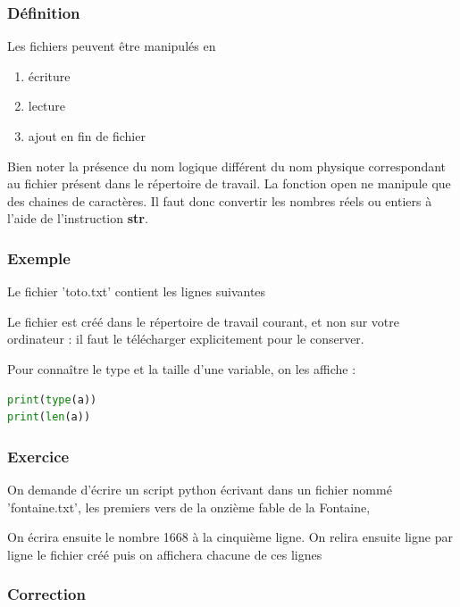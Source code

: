 \documentclass[a4paper,12pt]{article}
\begin{document}
\subsubsection{D\'efinition}
\begin{leftbar}
Les fichiers peuvent \^etre manipul\'es en
\begin{enumerate}
\item \'ecriture
\item lecture
\item ajout en fin de fichier
\end{enumerate}
Bien noter la pr\'esence du nom logique diff\'erent du nom physique correspondant au fichier pr\'esent dans le r\'epertoire de travail.  La fonction open ne manipule que des chaines de caract\`eres. Il faut donc convertir les nombres r\'eels ou entiers \`a l'aide de l'instruction \textbf{str}.
\end{leftbar}
\subsubsection{Exemple}



Le fichier 'toto.txt' contient les lignes suivantes


\begin{leftbar}
Le fichier est créé dans le répertoire de travail courant, et non sur votre ordinateur : il faut le télécharger explicitement pour le conserver.

Pour connaître le type et la taille d'une variable, on les affiche :
\begin{lstlisting}[language={Python}]
print(type(a))
print(len(a))
\end{lstlisting}
\end{leftbar}

\subsubsection{Exercice}
\begin{leftbar}
On demande d'\'ecrire un script python \'ecrivant dans un fichier nomm\'e 'fontaine.txt', les premiers vers de la onzi\`eme fable de la Fontaine, 

On \'ecrira ensuite le nombre 1668 \`a la cinqui\`eme ligne.
On relira ensuite ligne par ligne le fichier cr\'e\'e puis on affichera chacune de ces lignes
\end{leftbar}
\subsubsection{Correction}

\end{document}
